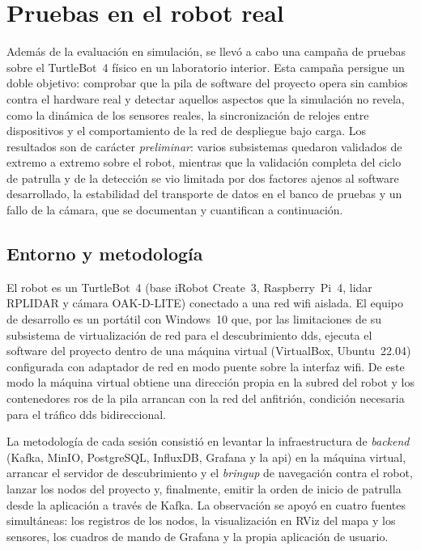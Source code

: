 \section{Pruebas en el robot real}
\label{sec:pruebas-real}

Además de la evaluación en simulación, se llevó a cabo una campaña de pruebas sobre el
\mbox{TurtleBot~4} físico en un laboratorio interior. Esta campaña persigue un doble objetivo:
comprobar que la pila de software del proyecto opera sin cambios contra el hardware real y
detectar aquellos aspectos que la simulación no revela, como la dinámica de los sensores reales,
la sincronización de relojes entre dispositivos y el comportamiento de la red de despliegue bajo
carga. Los resultados son de carácter \emph{preliminar}: varios subsistemas quedaron validados de
extremo a extremo sobre el robot, mientras que la validación completa del ciclo de patrulla y de
la detección se vio limitada por dos factores ajenos al software desarrollado, la estabilidad del
transporte de datos en el banco de pruebas y un fallo de la cámara, que se documentan
y cuantifican a continuación.

\subsection{Entorno y metodología}
\label{sec:real-entorno}

El robot es un \mbox{TurtleBot~4} (base iRobot Create~3, Raspberry~Pi~4, \gls{lidar} RPLIDAR y
cámara OAK-D-LITE) conectado a una red wifi aislada. El equipo de
desarrollo es un portátil con Windows~10 que, por las limitaciones de su subsistema de
virtualización de red para el descubrimiento \gls{dds}, ejecuta el software del proyecto dentro
de una máquina virtual (VirtualBox, Ubuntu~22.04) configurada con adaptador de red en modo puente
sobre la interfaz wifi. De este modo la máquina virtual obtiene una dirección propia en la subred
del robot y los contenedores \gls{ros} de la pila arrancan con la red del anfitrión, condición
necesaria para el tráfico \gls{dds} bidireccional.

La metodología de cada sesión consistió en levantar la infraestructura de \emph{backend} (Kafka,
MinIO, PostgreSQL, InfluxDB, Grafana y la \gls{api}) en la máquina virtual, arrancar el servidor
de descubrimiento y el \emph{bringup} de navegación contra el robot, lanzar los nodos del
proyecto y, finalmente, emitir la orden de inicio de patrulla desde la aplicación a través de
Kafka. La observación se apoyó en cuatro fuentes simultáneas: los registros de los nodos, la
visualización en RViz del mapa y los sensores, los cuadros de mando de Grafana y la propia
aplicación de usuario.


